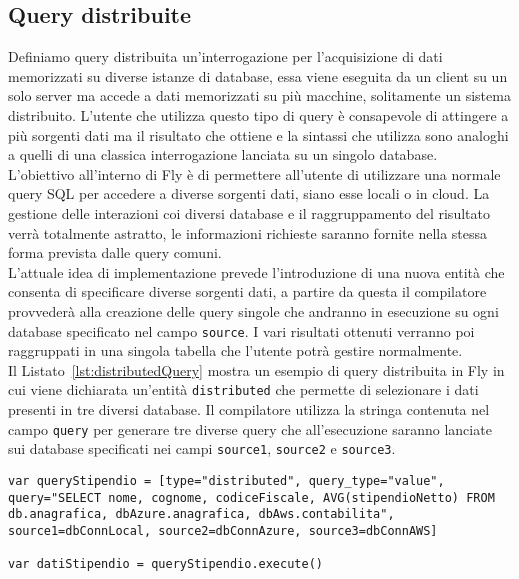 \subsection{Query distribuite}
Definiamo query distribuita un'interrogazione per l’acquisizione di dati memorizzati su diverse istanze di database, essa viene eseguita da un client su un solo server ma accede a dati memorizzati su più macchine, solitamente un sistema distribuito. L’utente che utilizza questo tipo di query è consapevole di attingere a più sorgenti dati ma il risultato che ottiene e la sintassi che utilizza sono analoghi a quelli di una classica interrogazione lanciata su un singolo database. \\
L’obiettivo all’interno di Fly è di permettere all’utente di utilizzare una normale query SQL per accedere a diverse sorgenti dati, siano esse locali o in cloud. La gestione delle interazioni coi diversi database e il raggruppamento del risultato verrà totalmente astratto, le informazioni richieste saranno fornite nella stessa forma prevista dalle query comuni. \\
L'attuale idea di implementazione prevede l'introduzione di una nuova entità che consenta di specificare diverse sorgenti dati, a partire da questa il compilatore provvederà alla creazione delle query singole che andranno in esecuzione su ogni database specificato nel campo \verb|source|. I vari risultati ottenuti verranno poi raggruppati in una singola tabella che l'utente potrà gestire normalmente.\\
Il Listato~\ref{lst:distributedQuery} mostra un esempio di query distribuita in Fly in cui viene dichiarata un'entità \verb|distributed| che permette di selezionare i dati presenti in tre diversi database. Il compilatore utilizza la stringa contenuta nel campo \verb|query| per generare tre diverse query che all'esecuzione saranno lanciate sui database specificati nei campi \verb|source1|, \verb|source2| e \verb|source3|.\\
\begin{lstlisting}[language=FLY,caption={Esempio di una Distributed Query in Fly.}, label={lst:distributedQuery}]
var queryStipendio = [type="distributed", query_type="value", query="SELECT nome, cognome, codiceFiscale, AVG(stipendioNetto) FROM db.anagrafica, dbAzure.anagrafica, dbAws.contabilita", source1=dbConnLocal, source2=dbConnAzure, source3=dbConnAWS]

var datiStipendio = queryStipendio.execute()
\end{lstlisting}